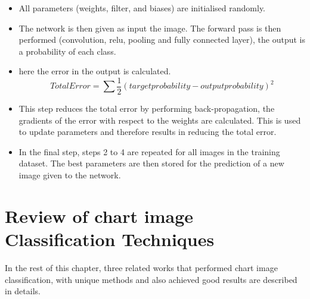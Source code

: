 \documentclass[12pt, a4paper,oneside]{report}
\begin{document}
\begin{itemize}
	\item All parameters (weights, filter, and biases) are initialised randomly.
	\item The network is then given as input the image. The forward pass is then performed (convolution, relu, pooling and fully connected layer),  the output is a probability of each class.
	\item here the error in the output is calculated.
	\[Total Error = \sum  \frac{1}{2} (target probability - output probability) ^2 \]
	\item This step reduces the total error by performing back-propagation, the gradients of the error with respect to the weights are calculated. This is used to update parameters and therefore results in reducing the total error.
	\item In the final step, steps 2 to 4 are repeated for all images in the training dataset. The best parameters are then stored for the prediction of a new image given to the network.\newline 
	
\end{itemize} 

\section{Review of chart image Classification Techniques}
In the rest of this chapter, three related works that performed chart image classification, with unique methods and also achieved good results are described in details.  
\end{document}
